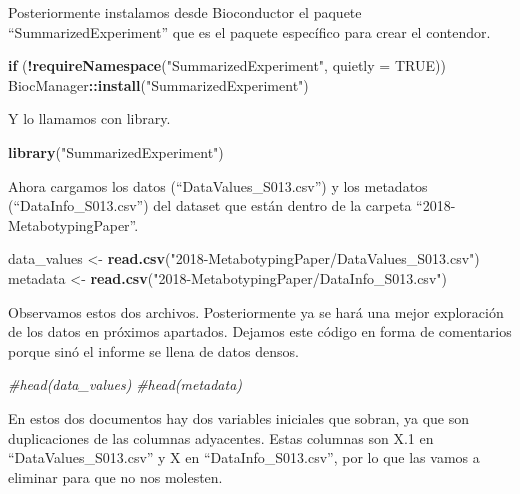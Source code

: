 \documentclass[
]{article}
\newenvironment{Shaded}{\begin{snugshade}}{\end{snugshade}}
\newcommand{\AttributeTok}[1]{\textcolor[rgb]{0.13,0.29,0.53}{#1}}
\newcommand{\CommentTok}[1]{\textcolor[rgb]{0.56,0.35,0.01}{\textit{#1}}}
\newcommand{\ConstantTok}[1]{\textcolor[rgb]{0.56,0.35,0.01}{#1}}
\newcommand{\ControlFlowTok}[1]{\textcolor[rgb]{0.13,0.29,0.53}{\textbf{#1}}}
\newcommand{\FunctionTok}[1]{\textcolor[rgb]{0.13,0.29,0.53}{\textbf{#1}}}
\newcommand{\NormalTok}[1]{#1}
\newcommand{\OtherTok}[1]{\textcolor[rgb]{0.56,0.35,0.01}{#1}}
\newcommand{\SpecialCharTok}[1]{\textcolor[rgb]{0.81,0.36,0.00}{\textbf{#1}}}
\newcommand{\StringTok}[1]{\textcolor[rgb]{0.31,0.60,0.02}{#1}}
\begin{document}
Posteriormente instalamos desde Bioconductor el paquete
``SummarizedExperiment'' que es el paquete específico para crear el
contendor.

\begin{Shaded}
\begin{Highlighting}[]
\ControlFlowTok{if}\NormalTok{ (}\SpecialCharTok{!}\FunctionTok{requireNamespace}\NormalTok{(}\StringTok{"SummarizedExperiment"}\NormalTok{, }\AttributeTok{quietly =} \ConstantTok{TRUE}\NormalTok{)) BiocManager}\SpecialCharTok{::}\FunctionTok{install}\NormalTok{(}\StringTok{"SummarizedExperiment"}\NormalTok{)}
\end{Highlighting}
\end{Shaded}

Y lo llamamos con library.

\begin{Shaded}
\begin{Highlighting}[]
\FunctionTok{library}\NormalTok{(}\StringTok{"SummarizedExperiment"}\NormalTok{)}
\end{Highlighting}
\end{Shaded}

Ahora cargamos los datos (``DataValues\_S013.csv'') y los metadatos
(``DataInfo\_S013.csv'') del dataset que están dentro de la carpeta
``2018-MetabotypingPaper''.

\begin{Shaded}
\begin{Highlighting}[]
\NormalTok{data\_values }\OtherTok{\textless{}{-}} \FunctionTok{read.csv}\NormalTok{(}\StringTok{"2018{-}MetabotypingPaper/DataValues\_S013.csv"}\NormalTok{)}
\NormalTok{metadata }\OtherTok{\textless{}{-}} \FunctionTok{read.csv}\NormalTok{(}\StringTok{"2018{-}MetabotypingPaper/DataInfo\_S013.csv"}\NormalTok{)}
\end{Highlighting}
\end{Shaded}

Observamos estos dos archivos. Posteriormente ya se hará una mejor
exploración de los datos en próximos apartados. Dejamos este código en
forma de comentarios porque sinó el informe se llena de datos densos.

\begin{Shaded}
\begin{Highlighting}[]
\CommentTok{\#head(data\_values)}
\CommentTok{\#head(metadata)}
\end{Highlighting}
\end{Shaded}

En estos dos documentos hay dos variables iniciales que sobran, ya que
son duplicaciones de las columnas adyacentes. Estas columnas son X.1 en
``DataValues\_S013.csv'' y X en ``DataInfo\_S013.csv'', por lo que las
vamos a eliminar para que no nos molesten.
\end{document}
